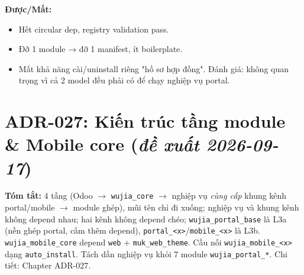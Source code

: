 \textbf{Được/Mất:}
\begin{itemize}
    \item[$+$] Hết circular dep, registry validation pass.
    \item[$+$] Đỡ 1 module → đỡ 1 manifest, ít boilerplate.
    \item[$-$] Mất khả năng cài/uninstall riêng "hồ sơ hợp đồng". Đánh giá: không quan trọng vì cả 2 model đều phải có để chạy nghiệp vụ portal.
\end{itemize}

\section{ADR-027: Kiến trúc tầng module \& Mobile core (\emph{đề xuất 2026-09-17})}

\textbf{Tóm tắt:} 4 tầng (Odoo $\rightarrow$ \texttt{wujia\_core} $\rightarrow$ nghiệp vụ \emph{cùng cấp} khung kênh portal/mobile $\rightarrow$ module ghép), mũi tên chỉ đi xuống; nghiệp vụ và khung kênh không depend nhau; hai kênh không depend chéo; \texttt{wujia\_portal\_base} là L3a (nền ghép portal, cấm thêm depend), \texttt{portal\_<x>}/\texttt{mobile\_<x>} là L3b. \texttt{wujia\_mobile\_core} depend \texttt{web} $+$ \texttt{muk\_web\_theme}. Cầu nối \texttt{wujia\_mobile\_<x>} dạng \texttt{auto\_install}. Tách dần nghiệp vụ khỏi 7 module \texttt{wujia\_portal\_*}. Chi tiết: Chapter ADR-027.

